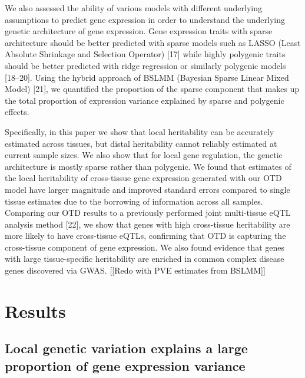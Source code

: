 \documentclass[]{article}
\begin{document}
We also assessed the ability of various models with different underlying
assumptions to predict gene expression in order to understand the
underlying genetic architecture of gene expression. Gene expression
traits with sparse architecture should be better predicted with sparse
models such as LASSO (Least Absolute Shrinkage and Selection Operator)
{[}17{]} while highly polygenic traits should be better predicted with
ridge regression or similarly polygenic models {[}18--20{]}. Using the
hybrid approach of BSLMM (Bayesian Sparse Linear Mixed Model) {[}21{]},
we quantified the proportion of the sparse component that makes up the
total proportion of expression variance explained by sparse and
polygenic effects.

Specifically, in this paper we show that local heritability can be
accurately estimated across tissues, but distal heritability cannot
reliably estimated at current sample sizes. We also show that for local
gene regulation, the genetic architecture is mostly sparse rather than
polygenic. We found that estimates of the local heritability of
cross-tissue gene expression generated with our OTD model have larger
magnitude and improved standard errors compared to single tissue
estimates due to the borrowing of information across all samples.
Comparing our OTD results to a previously performed joint multi-tissue
eQTL analysis method {[}22{]}, we show that genes with high cross-tissue
heritability are more likely to have cross-tissue eQTLs, confirming that
OTD is capturing the cross-tissue component of gene expression. We also
found evidence that genes with large tissue-specific heritability are
enriched in common complex disease genes discovered via GWAS. {[}{[}Redo
with PVE estimates from BSLMM{]}{]}

\section{Results}\label{results}

\subsection{Local genetic variation explains a large proportion of gene
expression
variance}\label{local-genetic-variation-explains-a-large-proportion-of-gene-expression-variance}
\end{document}
